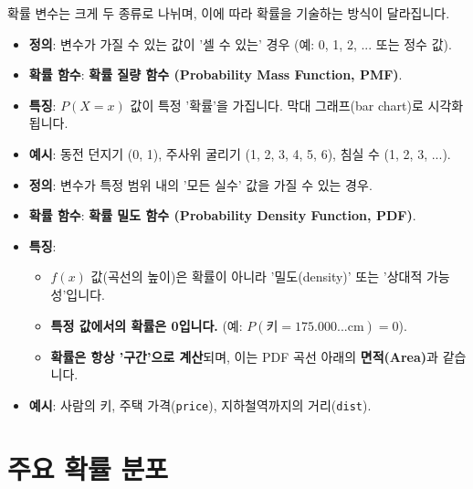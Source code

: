 \documentclass[11pt,a4paper]{book}
\theoremstyle{definition}
\begin{document}
확률 변수는 크게 두 종류로 나뉘며, 이에 따라 확률을 기술하는 방식이 달라집니다.

\begin{tcolorbox}[colback=blue!5!white, colframe=blue!75!black, title={이산형 확률 변수 (Discrete RV)}]
\begin{itemize}
    \item \textbf{정의}: 변수가 가질 수 있는 값이 '셀 수 있는' 경우 (예: 0, 1, 2, ... 또는 정수 값).
    \item \textbf{확률 함수}: \textbf{확률 질량 함수 (Probability Mass Function, PMF)}.
    \item \textbf{특징}: $P(X=x)$ 값이 특정 '확률'을 가집니다. 막대 그래프(bar chart)로 시각화됩니다.
    \item \textbf{예시}: 동전 던지기 (0, 1), 주사위 굴리기 (1, 2, 3, 4, 5, 6), 침실 수 (1, 2, 3, ...).
\end{itemize}
\end{tcolorbox}

\begin{tcolorbox}[colback=red!5!white, colframe=red!75!black, title={연속형 확률 변수 (Continuous RV)}]
\begin{itemize}
    \item \textbf{정의}: 변수가 특정 범위 내의 '모든 실수' 값을 가질 수 있는 경우.
    \item \textbf{확률 함수}: \textbf{확률 밀도 함수 (Probability Density Function, PDF)}.
    \item \textbf{특징}:
        \begin{itemize}
            \item $f(x)$ 값(곡선의 높이)은 확률이 아니라 '밀도(density)' 또는 '상대적 가능성'입니다.
            \item \textbf{특정 값에서의 확률은 0입니다.} (예: $P(\text{키}=175.000... \text{cm}) = 0$).
            \item \textbf{확률은 항상 '구간'으로 계산}되며, 이는 PDF 곡선 아래의 \textbf{면적(Area)}과 같습니다.
        \end{itemize}
    \item \textbf{예시}: 사람의 키, 주택 가격(\texttt{price}), 지하철역까지의 거리(\texttt{dist}).
\end{itemize}
\end{tcolorbox}

\section{주요 확률 분포}
\end{document}
